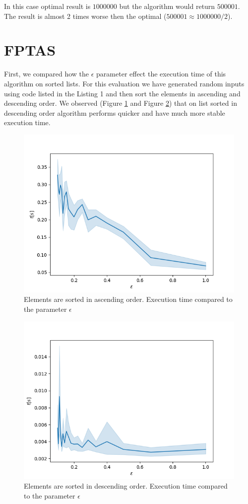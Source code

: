 \documentclass[a4paper,11pt]{article}
\theoremstyle{mytheor}
\begin{document}
In this case optimal result is $1000000$ but the algorithm would return $500001$. The result is almost 2 times worse then the optimal ($500001 \approx 1000000/2$).

\section{FPTAS}

First, we compared how the $\epsilon$ parameter effect the execution time of this algorithm on sorted lists. For this evaluation we have generated random inputs using code listed in the Listing 1 and then sort the elements in ascending and descending order. We observed (Figure \ref{img:eval-fptas-asc} and Figure \ref{img:eval-fptas-desc}) that on list sorted in descending order algorithm performs quicker and have much more stable execution time.

\begin{figure}[H]
  \includegraphics[width=.8\textwidth]{output/eval-fptas-asc}
  \centering
  \caption{Elements are sorted in ascending order. Execution time compared to the parameter $\epsilon$}
  \label{img:eval-fptas-asc}
\end{figure}

\begin{figure}[H]
  \includegraphics[width=.8\textwidth]{output/eval-fptas-desc}
  \centering
  \caption{Elements are sorted in descending order. Execution time compared to the parameter $\epsilon$}
  \label{img:eval-fptas-desc}
\end{figure}
\end{document}
